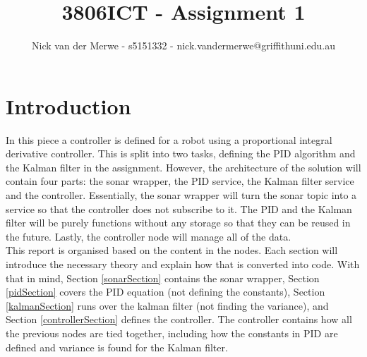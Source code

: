 \documentclass{article}
\title{3806ICT - Assignment 1}
\author{Nick van der Merwe - s5151332 - nick.vandermerwe@griffithuni.edu.au}
\newcommand\tab[1][1cm]{\hspace*{#1}}
\begin{document}
\maketitle
\section{Introduction}
In this piece a controller is defined for a robot using a proportional integral
derivative controller. This is split into two tasks, defining the PID algorithm
and the Kalman filter in the assignment. However, the architecture of the
solution will contain four parts: the sonar wrapper, the PID service, the Kalman
filter service and the controller. Essentially, the sonar wrapper will turn the
sonar topic into a service so that the controller does not subscribe to it. The
PID and the Kalman filter will be purely functions without any storage so that
they can be reused in the future. Lastly, the controller node will manage all of
the data. \\ 
\tab This report is organised based on the content in the nodes. Each section
will introduce the necessary theory and explain how that is converted into code.
With that in mind, Section \ref{sonarSection} contains the sonar wrapper,
Section \ref{pidSection} covers the PID equation (not defining the constants), 
Section \ref{kalmanSection} runs over the kalman filter (not finding the
variance), and Section \ref{controllerSection} defines the controller. The
controller contains how all the previous nodes are tied together, including how
the constants in PID are defined and variance is found for the Kalman filter.
\end{document}
